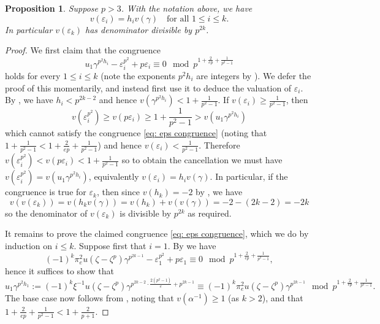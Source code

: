 \documentclass{amsart}
\newtheorem{proposition}[theorem]{Proposition}
\theoremstyle{definition}
\numberwithin{theorem}{section}
\numberwithin{equation}{section}
\begin{document}
\begin{proposition}\label{prop: recursive congruence}
    Suppose $p>3$. With the notation above, we have
    \[
    v(\varepsilon_i) = h_iv(\gamma) \quad \text{for all } 1 \leq i \leq k.
    \]
    In particular $v(\varepsilon_k)$ has denominator divisible by $p^{2k}$.
\end{proposition}

\begin{proof}
    We first claim that the congruence
    \begin{equation}\label{eq: eps congruence}
    u_1 \gamma^{p^2h_i} - \varepsilon_i^{p^2} + p\varepsilon_i \equiv 0 \mod p^{1+\frac{2}{ep} + \frac{1}{p^2-1}}
    \end{equation}
    holds for every $1 \leq i \leq k$ (note the exponents $p^2h_i$ are integers by ). We defer the proof of this momentarily, and instead first use it to deduce the valuation of $\varepsilon_i$. 
    By  , we have $h_i < p^{2k-2}$ and hence $v(\gamma^{p^2h_i})<1+\frac{1}{p^2-1}$. If $v(\varepsilon_i) \geq \frac{1}{p^2-1}$, then
    \[
    v(\varepsilon_i^{p^2}) \geq v(p\varepsilon_i) \geq 1 + \frac{1}{p^2-1} > v(u_1\gamma^{p^2h_i})
    \]
    which cannot satisfy the congruence \eqref{eq: eps congruence} (noting that $1 + \frac{1}{p^2-1}< 1 + \frac{2}{ep}+\frac{1}{p^2-1}$) and hence $v(\varepsilon_i) < \frac{1}{p^2-1}$. Therefore $v(\varepsilon_i^{p^2})< v(p\varepsilon_i)<1+\frac{1}{p^2-1}$ so to obtain the cancellation we must have $v(\varepsilon_i^{p^2})=v(u_1\gamma^{p^2h_i})$, equivalently $v(\varepsilon_i)=h_iv(\gamma)$.
    In particular, if the congruence is true for $\varepsilon_k$, then since $v(h_k)=-2$ by , we have
    \[
    v(v(\varepsilon_k))=v(h_kv(\gamma))=v(h_k)+v(v(\gamma))=-2 -(2k-2) = -2k
    \] 
    so the denominator of $v(\varepsilon_k)$ is divisible by $p^{2k}$ as required.
    
    It remains to prove the claimed congruence \eqref{eq: eps congruence}, which we do by induction on $i \leq k$. Suppose first that $i = 1$. By  we have
    \[
    (-1)^k\pi_e^2u(\zeta-\zeta^p)\gamma^{p^{2k-1}} - \varepsilon_1^{p^2} + p\varepsilon_1 \equiv 0 \mod{p^{1+\frac{2}{ep}+\frac{1}{p^2-1}}},
    \]
    hence it suffices to show that 
    \[
    u_1 \gamma^{p^2h_1} := (-1)^k\xi^{-1}u(\zeta-\zeta^p) \gamma^{p^{2k-2} \cdot\frac{2(p^2-1)}{e} + p^{2k-1}} \equiv (-1)^k\pi_e^2u(\zeta-\zeta^p)\gamma^{p^{2k-1}} \mod p^{1+\frac{2}{ep}+\frac{1}{p^2-1}}.
    \]
    The base case now follows from , noting that $v(\alpha^{-1}) \ge 1$ (as $k>2$), and that $1+ \frac{2}{ep} + \frac{1}{p^2-1} < 1 + \frac{2}{p+1}$.


\end{proof}
\end{document}

